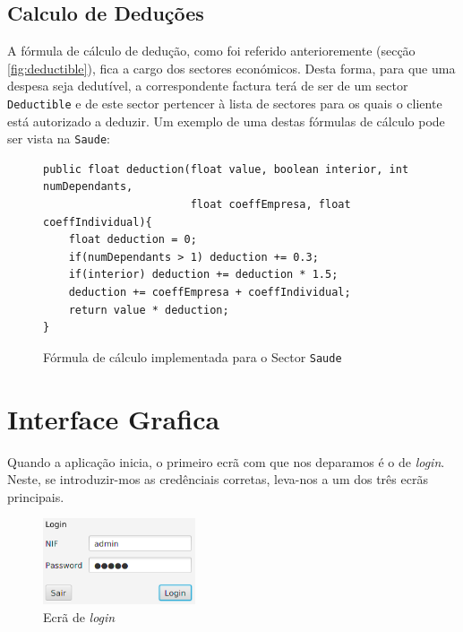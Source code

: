 \documentclass[12pt,a4paper]{report}
\begin{document}
\section{Calculo de Deduções}
    A fórmula de cálculo de dedução, como foi referido anterioremente (secção
    \ref{fig:deductible}), fica a cargo dos sectores económicos. Desta forma,
    para que uma despesa seja dedutível, a correspondente factura terá de ser de um
    sector \texttt{Deductible}
    e de este sector pertencer à lista de sectores para os quais o cliente está
    autorizado a deduzir. Um exemplo de uma destas fórmulas de cálculo pode
    ser vista na \texttt{Saude}:
    \begin{figure}[h]
        \begin{verbatim}
public float deduction(float value, boolean interior, int numDependants,
                       float coeffEmpresa, float coeffIndividual){
    float deduction = 0;
    if(numDependants > 1) deduction += 0.3;
    if(interior) deduction += deduction * 1.5;
    deduction += coeffEmpresa + coeffIndividual;
    return value * deduction;
}
        \end{verbatim}
        \caption{Fórmula de cálculo implementada para o Sector
                    \texttt{Saude}}
        \label{fig:formulaDeduct}
    \end{figure}

\chapter{Interface Grafica}

    Quando a aplicação inicia, o primeiro ecrã com que nos deparamos é o de
    \textit{login}. Neste, se introduzir-mos as credênciais corretas, leva-nos a um
    dos três ecrãs principais.
\begin{figure}[h]
    \centering
    \includegraphics[width=0.4\textwidth]{./images/login.png}
    \caption{Ecrã de \textit{login}}
    \label{fig:login}
\end{figure}
\end{document}
